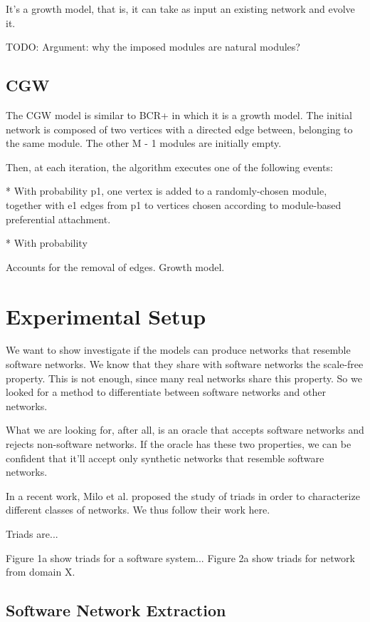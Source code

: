 It's a growth model, that is, it can take as input an existing network and
evolve it.

TODO: Argument: why the imposed modules are natural modules?

\subsection{CGW}

The CGW model is similar to BCR+ in which it is a growth model. The initial
network is composed of two vertices with a directed edge between, belonging
to the same module. The other M - 1 modules are initially empty.

Then, at each iteration, the algorithm executes one of the following events:

* With probability p1, one vertex is added to a randomly-chosen module, together
with e1 edges from p1 to vertices chosen according to module-based preferential
attachment.

* With probability 

Accounts for the removal of edges. Growth model.

\section{Experimental Setup}

We want to show investigate if the models can produce networks that resemble
software networks. We know that they share with software networks the scale-free
property. This is not enough, since many real networks share this property. So
we looked for a method to differentiate between software networks and other
networks.

What we are looking for, after all, is an oracle that accepts software networks
and rejects non-software networks. If the oracle has these two properties, we
can be confident that it'll accept only synthetic networks that resemble
software networks.

In a recent work, Milo et al. proposed the study of triads in order to
characterize different classes of networks. We thus follow their work here.

Triads are...

Figure 1a show triads for a software system... Figure 2a show triads for network
from domain X.

\subsection{Software Network Extraction}

